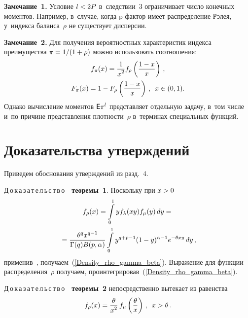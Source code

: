 \begin{multicols}{2}
\noindent
\textbf{Замечание~1.}
Условие $l\hm<2P$ в~следствии~3 ограничивает число конечных моментов. 
Например, в~случае, когда  \mbox{p-фак}\-тор имеет распределение Рэлея, 
у~индекса баланса~$\rho$ не существует дисперсии.


\smallskip

\noindent
\textbf{Замечание~2.}
Для получения вероятностных характеристик индекса преимущества $\pi\hm=1/(1\hm+\rho)$ 
можно использовать соотношения:
\begin{multline*}
f_\pi(x)=\displaystyle\frac{\displaystyle 1\mathstrut}{\displaystyle x^2\mathstrut}f_\rho\left(\displaystyle\frac{\displaystyle 1-x\mathstrut}{\displaystyle x\mathstrut}\right)\,,\\ 
F_\pi(x)=1-F_\rho\left(\displaystyle\frac{\displaystyle 1-x\mathstrut}{\displaystyle x\mathstrut}\right)\,,\enskip
x\in(0,1).
\end{multline*}
Однако вычисление моментов ${\sf E}\pi^l$ представляет отдельную задачу, 
в~том числе и~по причине представления плотности~$\rho$ в~терминах специальных функций.

\section{Доказательства утверждений}

Приведем обоснования утверждений из разд.~4.

\noindent
Д\,о\,к\,а\,з\,а\,т\,е\,л\,ь\,с\,т\,в\,о\ \ {\bf теоремы~1}. 
Поскольку при $x\hm>0$
\begin{multline*}
f_\rho(x)=\int\limits_0^1yf_\lambda(xy)f_\mu(y)\,dy={}\\
{}=\displaystyle\frac{\displaystyle \theta^qx^{q-1}\mathstrut}{\displaystyle \Gamma(q)B(p,\alpha)\mathstrut}
\int\limits_0^1y^{q+p-1}(1-y)^{\alpha-1}e^{-\theta xy}\,dy\,,
\end{multline*}
применив~\cite[формула 3.383]{GR1971}, получаем~(\ref{Density_rho_gamma_beta}). 
Выражение для функции распределения~$\rho$ получаем, 
проинтегрировав~(\ref{Density_rho_gamma_beta}).

\smallskip

\noindent
Д\,о\,к\,а\,з\,а\,т\,е\,л\,ь\,с\,т\,в\,о\ \ {\bf теоремы~2} 
непосредственно вытекает из равенства
$$
f_\rho(x)=\displaystyle\frac{\displaystyle \theta\mathstrut}{\displaystyle x^2\mathstrut}\,f_\mu\left(\displaystyle\frac{\displaystyle \theta\mathstrut}{\displaystyle x\mathstrut}\right)\,, \enskip x>\theta\,.
$$


\end{multicols}
